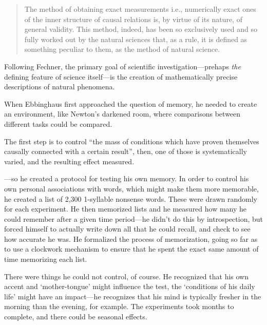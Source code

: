 \begin{refsection}
\begin{quote}
The method of obtaining exact measurements i.e., numerically exact ones of the inner structure of causal relations is, by virtue of its nature, of general validity. This method, indeed, has been so exclusively used and so fully worked out by the natural sciences that, as a rule, it is defined as something peculiar to them, as the method of natural science. ~\citep[p. 7]{Ebbinghaus:1885ud}
\end{quote}

Following Fechner, the primary goal of scientific investigation---prehaps \emph{the} defining feature of science itself---is the creation of mathematically precise descriptions of natural phenomena. 

When Ebbinghaus first approached the question of memory, he needed to create an environment, like Newton's darkened room, where comparisons between different tasks could be compared. 

The first step is to control ``the mass of conditions which have proven themselves causally connected with a certain result'', then, one of those is systematically varied, and the resulting effect measured.

---so he created a protocol for testing his own memory. In order to control his own personal associations with words, which might make them more memorable, he created a list of 2,300 1-syllable nonsense words. These were drawn randomly for each experiment. He then memorized lists and he measured how many he could remember after a given time period---he didn't do this by introspection, but forced himself to actually write down all that he could recall, and check to see how accurate he was. He formalized the process of memorization, going so far as to use a clockwork mechanism to ensure that he spent the exact same amount of time memorizing each list.

There were things he could not control, of course. He recognized that his own accent and `mother-tongue' might influence the test, the `conditions of his daily life' might have an impact---he recognizes that his mind is typically fresher in the morning than the evening, for example. The experiments took months to complete, and there could be seasonal effects. 


\end{refsection}
